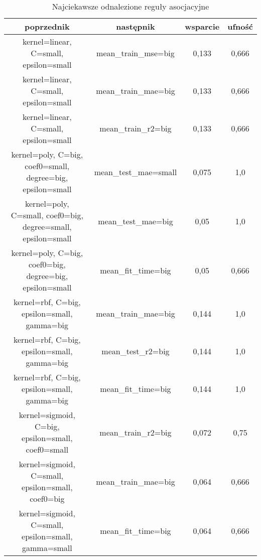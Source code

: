 \begin{table*}[t]
 \centering
 \begin{tabular}{||c c c c||} 
 \hline
 poprzednik & następnik & wsparcie & ufność \\ [0.5ex]
 \hline\hline
 kernel=linear, C=small, epsilon=small & mean\_{}train\_{}mse=big & 0,133 & 0,666 \\ 
 \hline
 kernel=linear, C=small, epsilon=small & mean\_{}train\_{}mae=big & 0,133 & 0,666 \\ 
 \hline
 kernel=linear, C=small, epsilon=small & mean\_{}train\_{}r2=big & 0,133 & 0,666 \\ 
 \hline
 kernel=poly, C=big, coef0=small, degree=big, epsilon=small & mean\_{}test\_{}mae=small & 0,075 & 1,0 \\ 
 \hline
 kernel=poly, C=small, coef0=big, degree=small, epsilon=small & mean\_{}test\_{}mae=big & 0,05 & 1,0 \\ 
 \hline
 kernel=poly, C=big, coef0=big, degree=big, epsilon=small & mean\_{}fit\_{}time=big & 0,05 & 0,666 \\
 \hline
 kernel=rbf, C=big, epsilon=small, gamma=big & mean\_{}train\_{}mae=big & 0,144 & 1,0 \\
 \hline
 kernel=rbf, C=big, epsilon=small, gamma=big & mean\_{}test\_{}r2=big & 0,144 & 1,0 \\
 \hline
 kernel=rbf, C=big, epsilon=small, gamma=big & mean\_{}fit\_{}time=big & 0,144 & 1,0 \\
 \hline
 kernel=sigmoid, C=big, epsilon=small, coef0=small & mean\_{}train\_{}r2=big & 0,072 & 0,75 \\
 \hline
 kernel=sigmoid, C=small, epsilon=small, coef0=big & mean\_{}train\_{}mae=big & 0,064 & 0,666 \\
 \hline
 kernel=sigmoid, C=small, epsilon=small, gamma=small & mean\_{}fit\_{}time=big & 0,064 & 0,666 \\
 \hline
\end{tabular}

\caption{Najciekawsze odnalezione reguły asocjacyjne \label{tab:reguly}}
\end{table*}
